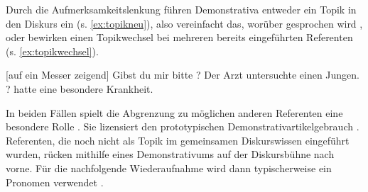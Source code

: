 \noindent
Durch die Aufmerksamkeitslenkung führen Demonstrativa  entweder ein Topik  in den Diskurs ein (s. \ref{ex:topikneu}), also vereinfacht das, worüber gesprochen wird \parencite{Jacobs2001}, oder bewirken einen Topikwechsel bei mehreren bereits eingeführten Referenten (s. \ref{ex:topikwechsel}).\largerpage

\begin{exe}
	\ex 
	\begin{xlist} \label{ex:proto-dem}
		\ex \label{ex:topikneu} [auf ein Messer zeigend] Gibst du mir bitte ?
		\ex \label{ex:topikwechsel} Der Arzt untersuchte einen Jungen.\\ ? hatte eine besondere Krankheit.  
		\end{xlist}
\end{exe}

\noindent
In beiden Fällen spielt die Abgrenzung zu möglichen anderen Referenten eine besondere Rolle \parencite[80]{Bisle-Muller1991}. Sie lizensiert den prototypischen Demonstrativartikelgebrauch  \parencite[s. auch][]{Schlachter2015}. Referenten, die noch nicht als Topik  im gemeinsamen Diskurswissen eingeführt wurden, rücken mithilfe eines Demonstrativums  auf der Diskursbühne nach vorne. Für die nachfolgende Wiederaufnahme wird dann typischerweise ein Pronomen verwendet \parencite[297]{Gundel1993}.\largerpage[2]

